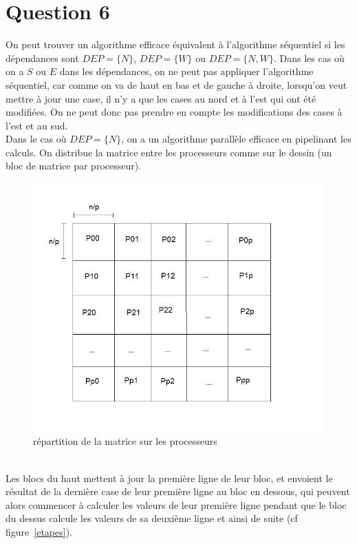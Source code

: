 \documentclass[a4paper,11pt]{article}
\begin{document}
\section*{Question 6}
On peut trouver un algorithme efficace équivalent à l'algorithme séquentiel si les dépendances sont $DEP = \{N\}$, $DEP = \{W\}$ ou $DEP = \{N, W\}$. Dans les cas où on a $S$ ou $E$ dans les dépendances, on ne peut pas appliquer l'algorithme séquentiel, car comme on va de haut en bas et de gauche à droite, lorsqu'on veut mettre à jour une case, il n'y a que les cases au nord et à l'est qui ont été modifiées. On ne peut donc pas prendre en compte les modifications des cases à l'est et au sud.\\
Dans le cas où $DEP = \{N\}$, on a un algorithme parallèle efficace en pipelinant les calculs. On distribue la matrice entre les processeurs comme sur le dessin (un bloc de matrice par processeur).
\begin{figure}[!h]
\includegraphics[scale=0.4]{repartition.png}
\caption{répartition de la matrice sur les processeurs}
\label{repartition}
\end{figure}
\\Les blocs du haut mettent à jour la première ligne de leur bloc, et envoient le résultat de la dernière case de leur première ligne au bloc en dessous, qui peuvent alors commencer à calculer les valeurs de leur première ligne pendant que le bloc du dessus calcule les valeurs de sa deuxième ligne et ainsi de suite (cf figure~\ref{etapes}).
\end{document}
